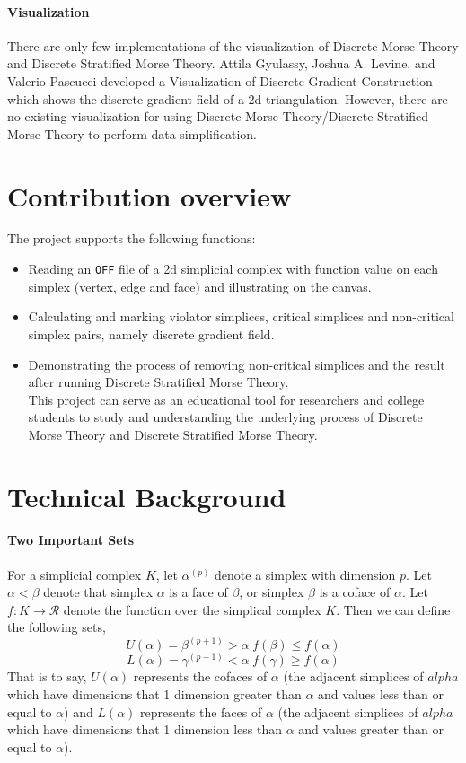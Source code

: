 \documentclass[12pt]{article}
\begin{document}
\paragraph{Visualization} There are only few implementations of the visualization of Discrete Morse Theory and Discrete Stratified Morse Theory. Attila Gyulassy, Joshua A. Levine, and Valerio Pascucci developed a Visualization of Discrete Gradient Construction which shows the discrete gradient field of a 2d triangulation. However, there are no existing visualization for using Discrete Morse Theory/Discrete Stratified Morse Theory to perform data simplification.

\section{Contribution overview}
The project supports the following functions:
\begin{itemize}
\item Reading an \texttt{OFF} file of a 2d simplicial complex with function value on each simplex (vertex, edge and face) and illustrating on the canvas.
\item Calculating and marking violator simplices, critical simplices and non-critical simplex pairs, namely discrete gradient field.
\item Demonstrating the process of removing non-critical simplices and the result after running Discrete Stratified Morse Theory.\\

This project can serve as an educational tool for researchers and college students to study and understanding the underlying process of Discrete Morse Theory and Discrete Stratified Morse Theory.
\end{itemize}

\section{Technical Background}
\paragraph{Two Important Sets} For a simplicial complex $K$, let $\alpha^{(p)}$ denote a simplex with dimension $p$. Let $\alpha < \beta$ denote that simplex $\alpha$ is a face of $\beta$, or simplex $\beta$ is a coface of $\alpha$. Let $f: K \rightarrow \mathcal{R}$ denote the function over the simplical complex $K$. Then we can define the following sets,
$$U(\alpha) = {\beta^{(p+1)} > \alpha | f(\beta) \le f(\alpha)}$$
$$L(\alpha) = {\gamma^{(p−1)} < \alpha | f(\gamma) \ge f(\alpha)}$$
That is to say, $U(\alpha)$ represents the cofaces of $\alpha$ (the adjacent simplices of $alpha$ which have dimensions that 1 dimension greater than $\alpha$ and values less than or equal to $\alpha$) and $L(\alpha)$ represents the faces of $\alpha$ (the adjacent simplices of $alpha$ which have dimensions that 1 dimension less than $\alpha$ and values greater than or equal to $\alpha$).
\end{document}
